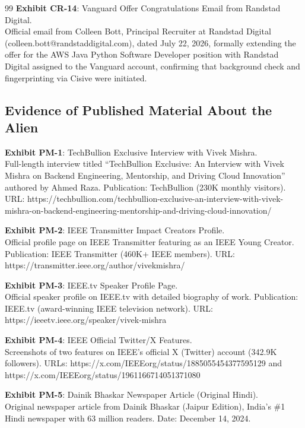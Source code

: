 \documentclass[11pt]{article}
\begin{document}
\begin{thebibliography}{99}
\textbf{Exhibit CR-14}: Vanguard Offer Congratulations Email from Randstad Digital.
\\Official email from Colleen Bott, Principal Recruiter at Randstad Digital (colleen.bott@randstaddigital.com), dated July 22, 2026, formally extending the offer for the AWS Java Python Software Developer position with Randstad Digital assigned to the Vanguard account, confirming that background check and fingerprinting via Cisive were initiated.

\subsection*{Evidence of Published Material About the Alien}

\textbf{Exhibit PM-1}: TechBullion Exclusive Interview with Vivek Mishra.
\\Full-length interview titled ``TechBullion Exclusive: An Interview with Vivek Mishra on Backend Engineering, Mentorship, and Driving Cloud Innovation'' authored by Ahmed Raza. Publication: TechBullion (230K monthly visitors). URL: https://techbullion.com/techbullion-exclusive-an-interview-with-vivek-mishra-on-backend-engineering-mentorship-and-driving-cloud-innovation/

\textbf{Exhibit PM-2}: IEEE Transmitter Impact Creators Profile.
\\Official profile page on IEEE Transmitter featuring \dr as an IEEE Young Creator. Publication: IEEE Transmitter (460K+ IEEE members). URL: https://transmitter.ieee.org/author/vivekmishra/

\textbf{Exhibit PM-3}: IEEE.tv Speaker Profile Page.
\\Official speaker profile on IEEE.tv with detailed biography of \drs work. Publication: IEEE.tv (award-winning IEEE television network). URL: https://ieeetv.ieee.org/speaker/vivek-mishra

\textbf{Exhibit PM-4}: IEEE Official Twitter/X Features.
\\Screenshots of two features on IEEE's official X (Twitter) account (342.9K followers). URLs: https://x.com/IEEEorg/status/1885055454377595129 and https://x.com/IEEEorg/status/1961166714051371080

\textbf{Exhibit PM-5}: Dainik Bhaskar Newspaper Article (Original Hindi).
\\Original newspaper article from Dainik Bhaskar (Jaipur Edition), India's \#1 Hindi newspaper with 63 million readers. Date: December 14, 2024.


\end{thebibliography}
\end{document}
